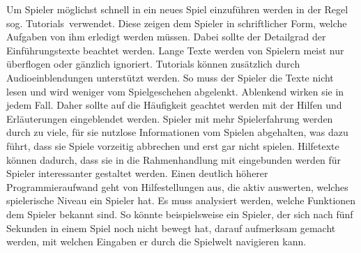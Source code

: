 \begin{description}




Um Spieler möglichst schnell in ein neues Spiel einzuführen werden in der Regel sog. \glqq Tutorials\grqq\ verwendet. Diese zeigen dem Spieler in schriftlicher Form, welche Aufgaben von ihm erledigt werden müssen. Dabei sollte der Detailgrad der Einführungstexte beachtet werden. Lange Texte werden von Spielern meist nur überflogen oder gänzlich ignoriert. Tutorials können zusätzlich durch Audioeinblendungen unterstützt werden. So muss der Spieler die Texte nicht lesen und wird weniger vom Spielgeschehen abgelenkt. Ablenkend wirken sie in jedem Fall. Daher sollte auf die Häufigkeit geachtet werden mit der Hilfen und Erläuterungen eingeblendet werden. Spieler mit mehr Spielerfahrung werden durch zu viele, für sie nutzlose Informationen vom Spielen abgehalten, was dazu führt, dass sie Spiele vorzeitig abbrechen und erst gar nicht spielen. Hilfetexte können dadurch, dass sie in die Rahmenhandlung mit eingebunden werden für Spieler interessanter gestaltet werden. Einen deutlich höherer Programmieraufwand geht von Hilfestellungen aus, die aktiv auswerten, welches spielerische Niveau ein Spieler hat. Es muss analysiert werden, welche Funktionen dem Spieler bekannt sind. So könnte beispielsweise ein Spieler, der sich nach fünf Sekunden in einem Spiel noch nicht bewegt hat, darauf aufmerksam gemacht werden, mit welchen Eingaben er durch die Spielwelt navigieren kann.  \cite[S. 73 f]{Adams:1515529}



\end{description}

